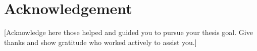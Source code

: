 ﻿\chapter*{Acknowledgement}
[Acknowledge here those helped and guided you to pursue your thesis goal. Give thanks and show gratitude who worked actively to assist you.]
